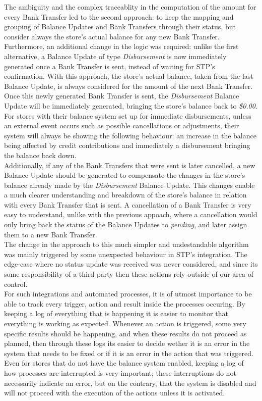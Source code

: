 The ambiguity and the complex traceablity in the computation of the amount for every Bank Transfer led to the second approach: to keep the mapping and grouping of Balance Updates and Bank Transfers through their status, but consider always the store's actual balance for any new Bank Transfer. Furthermore, an additional change in the logic was required: unlike the first alternative, a Balance Update of type \textit{Disbursement} is now immediately generated once a Bank Transfer is sent, instead of waiting for STP's confirmation. With this approach, the store's actual balance, taken from the last Balance Update, is always considered for the amount of the next Bank Transfer. Once this newly generated Bank Transfer is sent, the \textit{Disbursement} Balance Update will be immediately generated, bringing the store's balance back to \textit{\$0.00}.\\ 

For stores with their balance system set up for immediate disbursements, unless an external event occurs such as possible cancellations or adjustments, their system will always be showing the following behaviour: an increase in the balance being affected by credit contributions and immediately a disbursement bringing the balance back down.\\


Additionally, if any of the Bank Transfers that were sent is later cancelled, a new Balance Update should be generated to compensate the changes in the store's balance already made by the \textit{Disbursement} Balance Update. This changes enable a much clearer understanding and breakdown of the store's balance in relation with every Bank Transfer that is sent. A cancellation of a Bank Transfer is very easy to understand, unlike with the previous appoach, where a cancellation would only bring back the status of the Balance Updates to \textit{pending}, and later assign them to a new Bank Transfer.\\ 

The change in the approach to this much simpler and undestandable algorithm was mainly triggered by some unexpected behaviour in STP's integration. The edge-case where no status update was received was never considered, and since its some responsibility of a third party then these actions rely outside of our area of control.\\ 

For such integrations and automated processes, it is of utmost importance to be able to track every trigger, action and result inside the processes occuring. By keeping a log of everything that is happening it is easier to monitor that everything is working as expected. Whenever an action is triggered, some very specific results should be happening, and when these results do not proceed as planned, then through these logs its easier to decide wether it is an error in the system that needs to be fixed or if it is an error in the action that was triggered. Even for stores that do not have the balance system enabled, keeping  a log of how processes are interrupted is very important; these interruptions do not necessarily indicate an error, but on the contrary, that the system is disabled and will not proceed with the execution of the actions unless it is activated.

